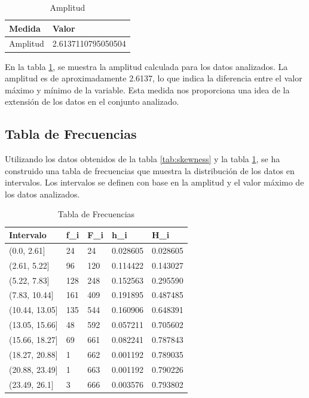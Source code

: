 \begin{table}[htbp]
    \centering
    \caption{Amplitud}
    \begin{tabular}{ll}
        \hline
        \textbf{Medida} & \textbf{Valor}     \\
        \hline
        Amplitud        & 2.6137110795050504 \\
        \hline
    \end{tabular}
    \label{tab:amplitud}
\end{table}

En la tabla \ref{tab:amplitud}, se muestra la amplitud calculada para los datos analizados. La amplitud es de
aproximadamente 2.6137, lo que indica la diferencia entre el valor máximo y mínimo de la variable.
Esta medida nos proporciona una idea de la extensión de los datos en el conjunto analizado.

\subsection{Tabla de Frecuencias}

Utilizando los datos obtenidos de la tabla \ref{tab:skewness} y la tabla
\ref{tab:amplitud}, se ha construido una tabla de frecuencias que muestra la
distribución de los datos en intervalos. Los intervalos se definen con base en la
amplitud y el valor máximo de los datos analizados.

\begin{table}[ht]
    \centering
    \caption{Tabla de Frecuencias}
    \begin{tabular}{|l|l|l|l|l|}
        \hline
        \textbf{Intervalo} & \textbf{f\_i} & \textbf{F\_i} & \textbf{h\_i} & \textbf{H\_i} \\
        \hline
        (0.0, 2.61]        & 24            & 24            & 0.028605      & 0.028605      \\
        (2.61, 5.22]       & 96            & 120           & 0.114422      & 0.143027      \\
        (5.22, 7.83]       & 128           & 248           & 0.152563      & 0.295590      \\
        (7.83, 10.44]      & 161           & 409           & 0.191895      & 0.487485      \\
        (10.44, 13.05]     & 135           & 544           & 0.160906      & 0.648391      \\
        (13.05, 15.66]     & 48            & 592           & 0.057211      & 0.705602      \\
        (15.66, 18.27]     & 69            & 661           & 0.082241      & 0.787843      \\
        (18.27, 20.88]     & 1             & 662           & 0.001192      & 0.789035      \\
        (20.88, 23.49]     & 1             & 663           & 0.001192      & 0.790226      \\
        (23.49, 26.1]      & 3             & 666           & 0.003576      & 0.793802      \\
        \hline
    \end{tabular}
    \label{tab:tabla_frecuencias}
\end{table}

